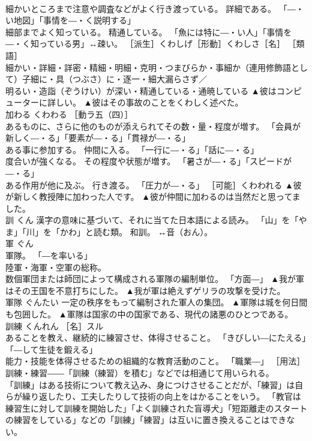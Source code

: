 \documentclass[8pt]{extreport}
\begin{document}
\begin{CJK}{UTF8}{min}
\\	細かいところまで注意や調査などがよく行き渡っている。 詳細である。 「―・い地図」「事情を―・く説明する」 
\\	細部までよく知っている。 精通している。 「魚には特に―・い人」「事情を―・く知っている男」↔疎い。 ［派生］くわしげ［形動］くわしさ［名］ ［類語］
\\	細かい・詳細・詳密・精細・明細・克明・つまびらか・事細か（連用修飾語として）子細に・具（つぶさ）に・逐一・細大漏らさず／
\\	明るい・造詣（ぞうけい）が深い・精通している・通暁している	▲彼はコンピューターに詳しい。 ▲彼はその事故のことをくわしく述べた。
\\	加わる	くわわる	［動ラ五（四）］ 
\\	あるものに、さらに他のものが添えられてその数・量・程度が増す。 「会員が新しく―・る」「要素が―・る」「貫禄が―・る」 
\\	ある事に参加する。 仲間に入る。 「一行に―・る」「話に―・る」 
\\	度合いが強くなる。 その程度や状態が増す。 「暑さが―・る」「スピードが―・る」 
\\	ある作用が他に及ぶ。 行き渡る。 「圧力が―・る」 ［可能］くわわれる	▲彼が新しく教授陣に加わった人です。 ▲彼が仲間に加わるのは当然だと思ってました。
\\	訓	くん	漢字の意味に基づいて、それに当てた日本語による読み。 「山」を「やま」「川」を「かわ」と読む類。 和訓。 ↔音（おん）。	
\\	軍	ぐん	
\\	軍隊。 「―を率いる」 
\\	陸軍・海軍・空軍の総称。 
\\	数個軍団または師団によって構成される軍隊の編制単位。 「方面―」	▲我が軍はその王国を不意打ちにした。 ▲我が軍は絶えずゲリラの攻撃を受けた。
\\	軍隊	ぐんたい	一定の秩序をもって編制された軍人の集団。	▲軍隊は城を何日間も包囲した。 ▲軍隊は国家の中の国家である、現代の諸悪のひとつである。
\\	訓練	くんれん	［名］スル 
\\	あることを教え、継続的に練習させ、体得させること。 「きびしい―にたえる」「―して生徒を鍛える」 
\\	能力・技能を体得させるための組織的な教育活動のこと。 「職業―」 ［用法］訓練・練習――「訓練（練習）を積む」などでは相通じて用いられる。 
\\	「訓練」はある技術について教え込み、身につけさせることだが、「練習」は自らが繰り返したり、工夫したりして技術の向上をはかることをいう。 「教官は練習生に対して訓練を開始した」「よく訓練された盲導犬」「短距離走のスタートの練習をしている」などの「訓練」「練習」は互いに置き換えることはできない。 

\end{CJK}
\end{document}
